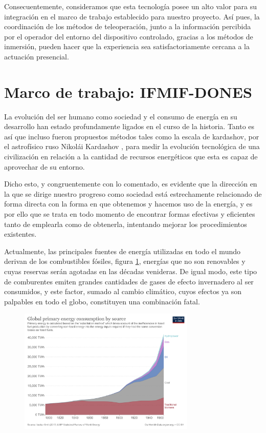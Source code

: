 Consecuentemente, consideramos que esta tecnología posee un alto valor para su integración en el marco de trabajo establecido para nuestro proyecto. Así pues, la coordinación de los métodos de teleoperación, junto a la información percibida por el operador del entorno del dispositivo controlado, gracias a los métodos de inmersión, pueden hacer que la experiencia sea satisfactoriamente cercana a la actuación presencial.

\section{Marco de trabajo: IFMIF-DONES}

La evolución del ser humano como sociedad y el consumo de energía en su desarrollo han estado profundamente ligados en el curso de la historia. Tanto es así que incluso fueron propuestos métodos tales como la escala de kardashov, por el astrofísico ruso Nikolái Kardashov \cite{92}, para medir la evolución tecnológica de una civilización en relación a la cantidad de recursos energéticos que esta es capaz de aprovechar de su entorno.

Dicho esto, y congruentemente con lo comentado, es evidente que la dirección en la que se dirige nuestro progreso como sociedad está estrechamente relacionado de forma directa con la forma en que obtenemos y hacemos uso de la energía, y es por ello que se trata en todo momento de encontrar formas efectivas y eficientes tanto de emplearla como de obtenerla, intentando mejorar los procedimientos existentes. 

Actualmente, las principales fuentes de energía utilizadas en todo el mundo derivan de los combustibles fósiles, figura \ref{fig:energy_graph}, energías que no son renovables y cuyas reservas serán agotadas en las décadas venideras. De igual modo, este tipo de comburentes emiten grandes cantidades de gases de efecto invernadero al ser consumidos, y este factor, sumado al cambio climático, cuyos efectos ya son palpables en todo el globo, constituyen una combinación fatal.

\begin{figure}[hbt]
    \centering
    \includegraphics[width=0.75\textwidth]{imagenes/global-energy-substitution.png}
    \caption{\cite{82}}
    \label{fig:energy_graph}
\end{figure}


